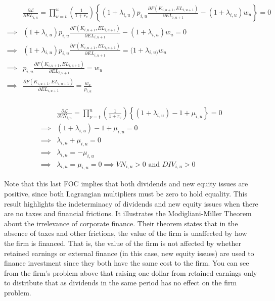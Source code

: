 \documentclass[letterpaper,12pt]{article}
\theoremstyle{definition}
\begin{document}
\begin{spacing}{1.5}
\begin{equation}
\label{eqn:lagrange_foc_l}
\begin{split}
& \frac{\partial \mathcal{L}}{\partial EL_{i,u}} =   \prod_{\nu=t}^{u} \left(\frac{1}{1+r_{v}}\right) \left\{(1+\lambda_{i,u})p_{i,u}\frac{\partial F(K_{i,u+1},EL_{i,u+1})}{\partial EL_{i,u+1}} - (1+\lambda_{i,u})w_{u} \right\} = 0 \\
\implies & (1+\lambda_{i,u})p_{i,u}\frac{\partial F(K_{i,u+1},EL_{i,u+1})}{\partial EL_{i,u+1}} - (1+\lambda_{i,u})w_{u}  = 0 \\
\implies & (1+\lambda_{i,u})p_{i,u}\frac{\partial F(K_{i,u+1},EL_{i,u+1})}{\partial EL_{i,u+1}} =  (1+\lambda_{i,u)}w_{u}  \\
\implies & p_{i,u}\frac{\partial F(K_{i,u+1},EL_{i,u+1})}{\partial EL_{i,u+1}} =  w_{u}  \\
\implies &\frac{\partial F(K_{i,u+1},EL_{i,u+1})}{\partial EL_{i,u+1}} =  \frac{w_{u}}{ p_{i,u}}  \\
\end{split}
\end{equation}


\begin{equation}
\label{eqn:lagrange_foc_vn}
\begin{split}
& \frac{\partial \mathcal{L}}{\partial VN_{i,u}} =   \prod_{\nu=t}^{u} \left(\frac{1}{1+r_{v}}\right) \left\{(1+\lambda_{i,u})- 1 + \mu_{i,u} \right\} = 0 \\
\implies & (1+\lambda_{i,u})- 1  +\mu_{i,u}  = 0 \\
\implies & \lambda_{i,u} + \mu_{i,u}=0  \\
\implies &\lambda_{i,u} = -\mu_{i,u} \\
\implies &  \lambda_{i,u}= \mu_{i,u} =0 \implies  VN_{i,u}>0 \text{ and } DIV_{i,u} > 0
\end{split}
\end{equation}


Note that this last FOC implies that both dividends and new equity issues are positive, since both Lagrangian multipliers must be zero to hold equality.  This result highlights the indeterminacy of dividends and new equity issues when there are no taxes and financial frictions.  It illustrates the Modigliani-Miller Theorem about the irrelevance of corporate finance. Their theorem states that in the absence of taxes and other frictions, the value of the firm is unaffected by how the firm is financed.  That is, the value of the firm is not affected by whether retained earnings or external finance (in this case, new equity issues) are used to finance investment since they both have the same cost to the firm.  You can see from the firm's problem above that raising one dollar from retained earnings only to distribute that as dividends in the same period has no effect on the firm problem.


\end{spacing}
\end{document}
